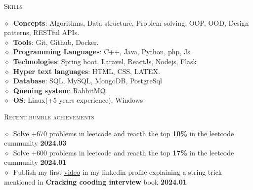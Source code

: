 \documentclass[11pt, a4paper]{article}
\newcommand{\dates}[1]{\hfill\mbox{\textbf{#1}}} %
\newcommand{\smaller}[1]{{\small$\diamond$\ #1}}
\newcommand{\headright}[1]{\vspace*{2.5ex}\textsc{\Large\color{secondColor}#1}\par%
     \vspace*{-2ex}{\color{secondColor}\hrulefill}\par}
\begin{document}
\begin{minipage}[t]{0.56\textwidth}
\headright{Skills}
\smaller{\textbf{Concepts}: Algorithms, Data structure, Problem solving, OOP, OOD, Design patterns, RESTful APIs.} \\
\smaller{\textbf{Tools}: Git, Github, Docker.} \\
\smaller{\textbf{Programming Languages}: C++, Java, Python, php, Js.} \\
\smaller{\textbf{Technologies}: Spring boot, Laravel, ReactJs, Nodejs, Flask} \\
\smaller{\textbf{Hyper text languages}: HTML, CSS, LATEX.} \\ 
\smaller{\textbf{Database}: SQL, MySQL, MongoDB, PostgreSql} \\
\smaller{\textbf{Queuing system}: RabbitMQ} \\
\smaller{\textbf{OS}: Linux(+5 years experience), Windows}

\headright{Recent humble achievements}
\smaller{Solve +670 problems in leetcode and reacth the top \textbf{10\%} in the leetcode cummunity} \dates{2024.03} \\
\smaller{Solve +600 problems in leetcode and reacth the top \textbf{17\%} in the leetcode cummunity} \dates{2024.01} \\
\smaller{Publish my first \href{https://www.linkedin.com/posts/sofyanmahmoud0000_the-difference-between-str-str-activity-7151649201855045634-XyjD?utm_source=share&utm_medium=member_desktop}{video} in my linkedin profile explaining a string trick mentioned in \textbf{Cracking cooding interview} book} \dates{2024.01} \\

\end{minipage}
\end{document}
